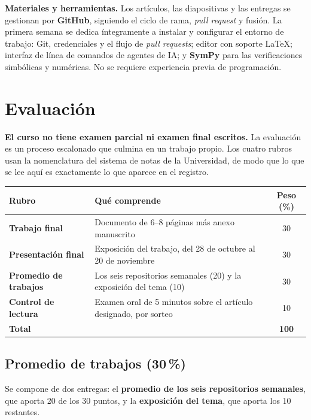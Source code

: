 \documentclass[11pt]{article}
\begin{document}
\textbf{Materiales y herramientas.} Los art\'iculos, las diapositivas y las entregas se gestionan por \textbf{GitHub}, siguiendo el ciclo de rama, \emph{pull request} y fusi\'on. La primera semana se dedica \'integramente a instalar y configurar el entorno de trabajo: Git, credenciales y el flujo de \emph{pull requests}; editor con soporte \LaTeX; interfaz de l\'inea de comandos de agentes de IA; y \textbf{SymPy} para las verificaciones simb\'olicas y num\'ericas. No se requiere experiencia previa de programaci\'on.

\section{Evaluaci\'on}

\textbf{El curso no tiene examen parcial ni examen final escritos.} La evaluaci\'on es un proceso escalonado que culmina en un trabajo propio. Los cuatro rubros usan la nomenclatura del sistema de notas de la Universidad, de modo que lo que se lee aqu\'i es exactamente lo que aparece en el registro.

\begin{center}
\begin{tabularx}{\textwidth}{@{}lXc@{}}
\toprule
\textbf{Rubro} & \textbf{Qu\'e comprende} & \textbf{Peso (\%)} \\
\midrule
\textbf{Trabajo final} & Documento de 6--8 p\'aginas m\'as anexo manuscrito & 30 \\
\textbf{Presentaci\'on final} & Exposici\'on del trabajo, del 28 de octubre al 20 de noviembre & 30 \\
\textbf{Promedio de trabajos} & Los seis repositorios semanales (20) y la exposici\'on del tema (10) & 30 \\
\textbf{Control de lectura} & Examen oral de 5 minutos sobre el art\'iculo designado, por sorteo & 10 \\
\midrule
\textbf{Total} & & \textbf{100} \\
\bottomrule
\end{tabularx}
\end{center}

\subsection*{Promedio de trabajos (30\,\%)}

Se compone de dos entregas: el \textbf{promedio de los seis repositorios semanales}, que aporta 20 de los 30 puntos, y la \textbf{exposici\'on del tema}, que aporta los 10 restantes.
\end{document}
